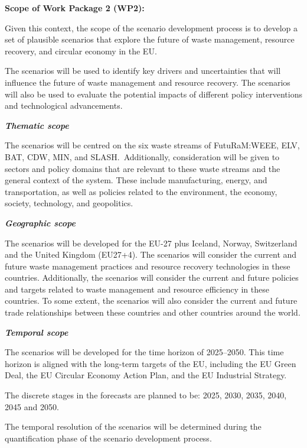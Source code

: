 \vspace{3em}

\textbf{Scope of Work Package 2 (WP2):}

Given this context, the scope of the scenario development process is to develop a set of plausible scenarios that explore the future of waste management, resource recovery, and circular economy in the EU.

The scenarios will be used to identify key drivers and uncertainties that will influence the future of waste management and resource recovery. The scenarios will also be used to evaluate the potential impacts of different policy interventions and technological advancements.


\textbf{\textit{Thematic scope}}

The scenarios will be centred on the six waste streams of FutuRaM:\@ WEEE, ELV, BAT, CDW, MIN, and SLASH.\ Additionally, consideration will be given to sectors and policy domains that are relevant to these waste streams and the general context of the system. These include manufacturing, energy, and transportation, as well as policies related to the environment, the economy, society, technology, and geopolitics.

\textbf{\textit{Geographic scope}}

The scenarios will be developed for the EU-27 plus Iceland, Norway, Switzerland and the United Kingdom (EU27+4). The scenarios will consider the current and future waste management practices and resource recovery technologies in these countries.
\vspace{\baselineskip}
Additionally, the scenarios will consider the current and future policies and targets related to waste management and resource efficiency in these countries. To some extent, the scenarios will also consider the current and future trade relationships between these countries and other countries around the world.

\textbf{\textit{Temporal scope}}

The scenarios will be developed for the time horizon of 2025--2050. This time horizon is aligned with the long-term targets of the EU, including the EU Green Deal, the EU Circular Economy Action Plan, and the EU Industrial Strategy.

The discrete stages in the forecasts are planned to be: 2025, 2030, 2035, 2040, 2045 and 2050.

The temporal resolution of the scenarios will be determined during the quantification phase of the scenario development process.

